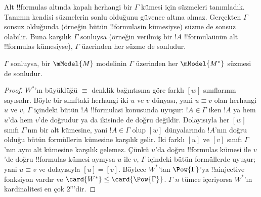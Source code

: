 



Alt !!{formula}s altında kapalı herhangi bir $\Gamma$ kümesi için süzmeleri
tanımladık. Tanımın kendisi süzmelerin sonlu olduğunu güvence altına almaz.
Gerçekten $\Gamma$ sonsuz olduğunda (örneğin bütün !!{formula}s{}in kümesiyse)
süzme de sonsuz olabilir. Buna karşılık $\Gamma$ sonluysa (örneğin verilmiş
bir $!A$ !!{formula}{}ünün alt !!{formula}s kümesiyse), $\Gamma$ üzerinden
her süzme de sonludur.

\begin{prop}
  $\Gamma$ sonluysa, bir $\mModel{M}$ modelinin $\Gamma$ üzerinden her
  $\mModel{M^*}$ süzmesi de sonludur.
\end{prop}

\begin{proof}
  $W^*$'ın büyüklüğü $\equiv$ denklik bağıntısına göre farklı $[w]$
  sınıflarının sayısıdır. Böyle bir sınıftaki herhangi iki $u$ ve $v$ dünyası,
  yani $u\equiv v$ olan herhangi $u$ ve $v$, $\Gamma$ içindeki bütün $!A$
  !!{formula}s{}i konusunda uyuşur: $!A\in\Gamma$ iken $!A$ ya hem $u$'da
  hem $v$'de doğrudur ya da ikisinde de doğru değildir. Dolayısıyla her
  $[w]$ sınıfı $\Gamma$'nın bir alt kümesine, yani $!A\in\Gamma$ olup
  $[w]$ dünyalarında $!A$'nın doğru olduğu bütün formüllerin kümesine karşılık
  gelir. İki farklı
  $[u]$ ve $[v]$ sınıfı $\Gamma$'nın aynı alt kümesine karşılık gelemez.
  Çünkü $u$'da doğru !!{formula}s kümesi ile $v$'de doğru !!{formula}s
  kümesi aynıysa $u$ ile $v$, $\Gamma$ içindeki bütün formüllerde uyuşur;
  yani $u\equiv v$ ve dolayısıyla $[u]=[v]$. Böylece $W^*$'tan
  $\Pow{\Gamma}$'ya !!a{injective} fonksiyon vardır ve
  $\card{W^*}\leq\card{\Pow{\Gamma}}$. $\Gamma$ $n$ tümce içeriyorsa
  $W^*$'ın kardinalitesi en çok $2^n$'dir.
\end{proof}

